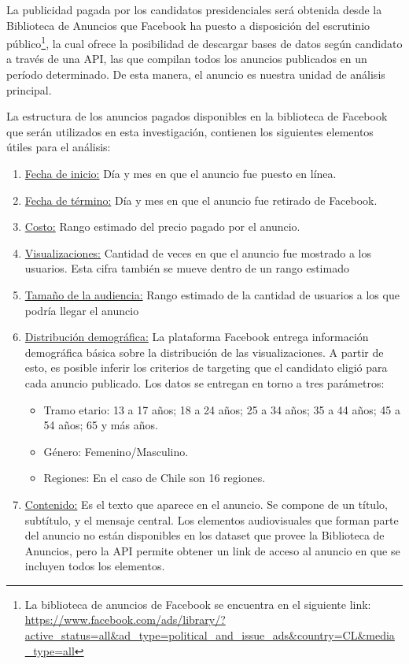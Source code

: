 \documentclass[
  10pt,
  letterpaper,
]{report}
\providecommand{\tightlist}{%
  \setlength{\itemsep}{0pt}\setlength{\parskip}{0pt}}
\begin{document}
La publicidad pagada por los candidatos presidenciales será obtenida
desde la Biblioteca de Anuncios que Facebook ha puesto a disposición del
escrutinio público\footnote{La biblioteca de anuncios de Facebook se
  encuentra en el siguiente link:
  \url{https://www.facebook.com/ads/library/?active_status=all\&ad_type=political_and_issue_ads\&country=CL\&media_type=all}},
la cual ofrece la posibilidad de descargar bases de datos según
candidato a través de una API, las que compilan todos los anuncios
publicados en un período determinado. De esta manera, el anuncio es
nuestra unidad de análisis principal.

La estructura de los anuncios pagados disponibles en la biblioteca de
Facebook que serán utilizados en esta investigación, contienen los
siguientes elementos útiles para el análisis:

\begin{enumerate}
\def\labelenumi{\arabic{enumi}.}
\tightlist
\item
  \underline{Fecha de inicio:} Día y mes en que el anuncio fue puesto en
  línea.
\item
  \underline{Fecha de término:} Día y mes en que el anuncio fue retirado
  de Facebook.
\item
  \underline{Costo:} Rango estimado del precio pagado por el anuncio.
\item
  \underline{Visualizaciones:} Cantidad de veces en que el anuncio fue
  mostrado a los usuarios. Esta cifra también se mueve dentro de un
  rango estimado
\item
  \underline{Tamaño de la audiencia:} Rango estimado de la cantidad de
  usuarios a los que podría llegar el anuncio
\item
  \underline{Distribución demográfica:} La plataforma Facebook entrega
  información demográfica básica sobre la distribución de las
  visualizaciones. A partir de esto, es posible inferir los criterios de
  targeting que el candidato eligió para cada anuncio publicado. Los
  datos se entregan en torno a tres parámetros:

  \begin{itemize}
  \tightlist
  \item
    Tramo etario: 13 a 17 años; 18 a 24 años; 25 a 34 años; 35 a 44
    años; 45 a 54 años; 65 y más años.
  \item
    Género: Femenino/Masculino.
  \item
    Regiones: En el caso de Chile son 16 regiones.
  \end{itemize}
\item
  \underline{Contenido:} Es el texto que aparece en el anuncio. Se
  compone de un título, subtítulo, y el mensaje central. Los elementos
  audiovisuales que forman parte del anuncio no están disponibles en los
  dataset que provee la Biblioteca de Anuncios, pero la API permite
  obtener un link de acceso al anuncio en que se incluyen todos los
  elementos.
\end{enumerate}
\end{document}
